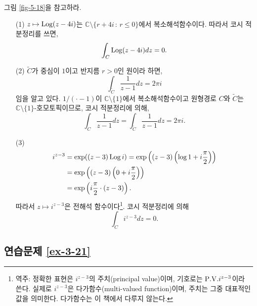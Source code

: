 그림 \ref{fig-5-18}을 참고하라.

\begin{itemize}
\item[(1)]  $z\mapsto \mathop{\mathrm{Log}}(z-4i)$는 $\mathbb C \setminus \{r+4i \,:\, r\le0\}$에서
복소해석함수이다. 따라서 코시 적분정리를 쓰면,
\[
\int_C \mathop{\mathrm{Log}} (z-4i)dz = 0.
\]
\item[(2)] $\tilde C$가 중심이 $1$이고 반지름 $r>0$인 원이라 하면,
\[
\int_{\tilde C} \dfrac1{z-1} dz = 2\pi i
\]
임을 알고 있다.
$1/(\cdot -1)$이 $\mathbb C\setminus\{1\}$에서 복소해석함수이고
원형경로 $C$와 $\tilde C$는 $\mathbb C\setminus\{1\}$-호모토픽이므로,
코시 적분정리에 의해,
\[
\int_C \dfrac1{z-1} dz = \int_{\tilde C} \dfrac1{z-1}dz = 2\pi i.
\]
\item[(3)] 
\begin{align*}
i^{z-3} &= \exp((z-3)\mathop{\mathrm{Log}} i) = \exp\left( (z-3)\left( \log 1 + i\displaystyle\frac\pi2\right)\right) \\
&= \exp\left( (z-3)\left(0+i\displaystyle\frac\pi2\right)\right) \\
&= \exp\left( i\displaystyle\frac\pi2 \cdot(z-3)\right).
\end{align*}
따라서 $z\mapsto i^{z-3}$은 전해석 함수이다\footnote{
역주: 정확한 표현은 $i^{z-3}$의 주치(principal value)이며, 기호로는 $\PV i^{z-3}$이라 쓴다.
실제로 $i^{z-3}$은 다가함수(multi-valued function)이며, 주치는 그중 대표적인 값을 의미한다.
다가함수는 이 책에서 다루지 않는다.
}.
코시 적분정리에 의해
\[
\int_C i^{z-3}dz = 0.
\]
\end{itemize}

\subsection*{연습문제 \ref{ex-3-21}}

